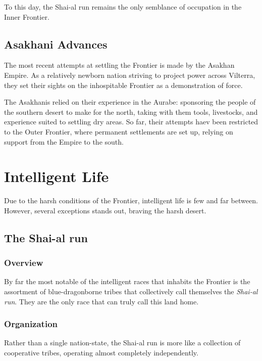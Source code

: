 \documentclass[../main.tex]{subfiles}
\begin{document}
To this day, the Shai-al run remains the only semblance of
occupation in the Inner Frontier.

\subsection{Asakhani Advances}
The most recent attempts at settling the Frontier is made by
the Asakhan Empire. As a relatively newborn nation striving to
project power across Vilterra, they set their sights on the
inhospitable Frontier as a demonstration of force.

The Asakhanis relied on their experience in the Aurabe:
sponsoring the people of the southern desert to make for the north,
taking with them tools, livestocks, and experience suited to settling dry areas.
So far, their attempts haev been restricted to the Outer Frontier,
where permanent settlements are set up, relying on support from
the Empire to the south.

\section{Intelligent Life}
Due to the harsh conditions of the Frontier, intelligent life is few and
far between. However, several exceptions stands out, braving the
harsh desert.

\subsection{The Shai-al run}
\subsubsection{Overview}
By far the most notable of the intelligent races that inhabits the
Frontier is the assortment of blue-dragonborne tribes that collectively
call themselves the \emph{Shai-al run}. They are the only race that can
truly call this land home.

\subsubsection{Organization}
Rather than a single nation-state, the Shai-al run is more like a
collection of cooperative tribes, operating almost completely
independently.
\end{document}
